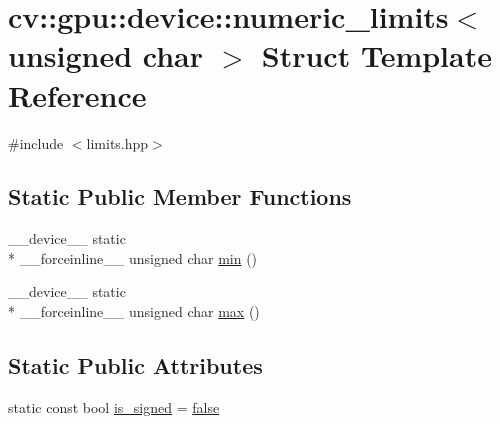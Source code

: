 \hypertarget{structcv_1_1gpu_1_1device_1_1numeric__limits_3_01unsigned_01char_01_4}{\section{cv\-:\-:gpu\-:\-:device\-:\-:numeric\-\_\-limits$<$ unsigned char $>$ Struct Template Reference}
\label{structcv_1_1gpu_1_1device_1_1numeric__limits_3_01unsigned_01char_01_4}
}


{\ttfamily \#include $<$limits.\-hpp$>$}

\subsection*{Static Public Member Functions}
\begin{DoxyCompactItemize}
\item 
\-\_\-\-\_\-device\-\_\-\-\_\- static \\*
\-\_\-\-\_\-forceinline\-\_\-\-\_\- unsigned char \hyperlink{structcv_1_1gpu_1_1device_1_1numeric__limits_3_01unsigned_01char_01_4_af47fc78a7cd599f23bd96b89add7d6f7}{min} ()
\item 
\-\_\-\-\_\-device\-\_\-\-\_\- static \\*
\-\_\-\-\_\-forceinline\-\_\-\-\_\- unsigned char \hyperlink{structcv_1_1gpu_1_1device_1_1numeric__limits_3_01unsigned_01char_01_4_a3deff829ec4b56f5faf9ab8950e7515a}{max} ()
\end{DoxyCompactItemize}
\subsection*{Static Public Attributes}
\begin{DoxyCompactItemize}
\item 
static const bool \hyperlink{structcv_1_1gpu_1_1device_1_1numeric__limits_3_01unsigned_01char_01_4_a9a0560ce42cf99cc109676631687103f}{is\-\_\-signed} = \hyperlink{namespacecv_1_1gpu_1_1device_af8d6418be1712e83b4f398e7e7273026}{false}
\end{DoxyCompactItemize}


